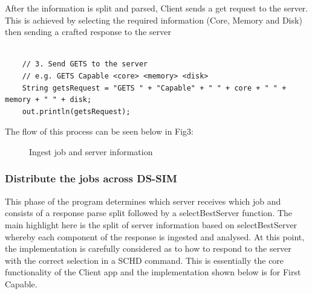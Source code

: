 After the information is split and parsed, Client sends a get request to the server. This is achieved by selecting the required information (Core, Memory and Disk) then sending a crafted response to the server

\begin{lstlisting}

    // 3. Send GETS to the server
    // e.g. GETS Capable <core> <memory> <disk>
    String getsRequest = "GETS " + "Capable" + " " + core + " " + memory + " " + disk;
    out.println(getsRequest);
\end{lstlisting}

The flow of this process can be seen below in Fig3:

\begin{figure}[h]
    \centering
    \caption{Ingest job and server information}
    \label{fig:communication}
\end{figure}

\subsubsection{Distribute the jobs across DS-SIM}
This phase of the program determines which server receives which job and consists of a response parse split followed by a selectBestServer function. The main highlight here is the split of server information based on selectBestServer whereby each component of the response is ingested and analysed. At this point, the implementation is carefully considered as to how to respond to the server with the correct selection in a SCHD command. This is essentially the core functionality of the Client app and the implementation shown below is for First Capable. 

